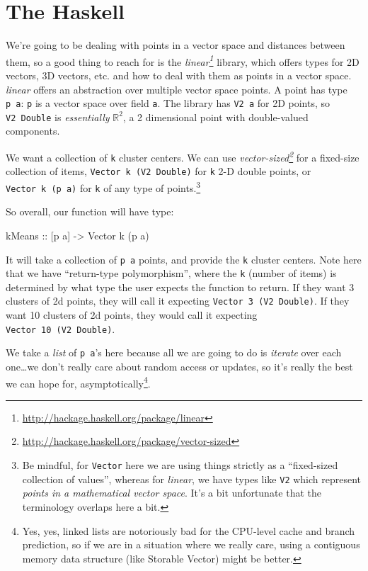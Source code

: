 \documentclass[]{article}
\newenvironment{Shaded}{}{}
\newcommand{\DataTypeTok}[1]{\textcolor[rgb]{0.56,0.13,0.00}{#1}}
\newcommand{\NormalTok}[1]{#1}
\newcommand{\OtherTok}[1]{\textcolor[rgb]{0.00,0.44,0.13}{#1}}
\renewcommand{\href}[2]{#2\footnote{\url{#1}}}
\begin{document}
\section{The Haskell}\label{the-haskell}

We're going to be dealing with points in a vector space and distances between
them, so a good thing to reach for is the
\emph{\href{http://hackage.haskell.org/package/linear}{linear}} library, which
offers types for 2D vectors, 3D vectors, etc. and how to deal with them as
points in a vector space. \emph{linear} offers an abstraction over multiple
vector space points. A point has type \texttt{p\ a}: \texttt{p} is a vector
space over field \texttt{a}. The library has \texttt{V2\ a} for 2D points, so
\texttt{V2\ Double} is \emph{essentially} \(\mathbb{R}^2\), a 2 dimensional
point with double-valued components.

We want a collection of \texttt{k} cluster centers. We can use
\emph{\href{http://hackage.haskell.org/package/vector-sized}{vector-sized}} for
a fixed-size collection of items, \texttt{Vector\ k\ (V2\ Double)} for
\texttt{k} 2-D double points, or \texttt{Vector\ k\ (p\ a)} for \texttt{k} of
any type of points.\footnote{Be mindful, for \texttt{Vector} here we are using
  things strictly as a ``fixed-sized collection of values'', whereas for
  \emph{linear}, we have types like \texttt{V2} which represent \emph{points in
  a mathematical vector space}. It's a bit unfortunate that the terminology
  overlaps here a bit.}

So overall, our function will have type:

\begin{Shaded}
\begin{Highlighting}[]
\OtherTok{kMeans ::}\NormalTok{ [p a] }\OtherTok{{-}\textgreater{}} \DataTypeTok{Vector}\NormalTok{ k (p a)}
\end{Highlighting}
\end{Shaded}

It will take a collection of \texttt{p\ a} points, and provide the \texttt{k}
cluster centers. Note here that we have ``return-type polymorphism'', where the
\texttt{k} (number of items) is determined by what type the user expects the
function to return. If they want 3 clusters of 2d points, they will call it
expecting \texttt{Vector\ 3\ (V2\ Double)}. If they want 10 clusters of 2d
points, they would call it expecting \texttt{Vector\ 10\ (V2\ Double)}.

We take a \emph{list} of \texttt{p\ a}'s here because all we are going to do is
\emph{iterate} over each one\ldots we don't really care about random access or
updates, so it's really the best we can hope for, asymptotically\footnote{Yes,
  yes, linked lists are notoriously bad for the CPU-level cache and branch
  prediction, so if we are in a situation where we really care, using a
  contiguous memory data structure (like Storable Vector) might be better.}.
\end{document}
